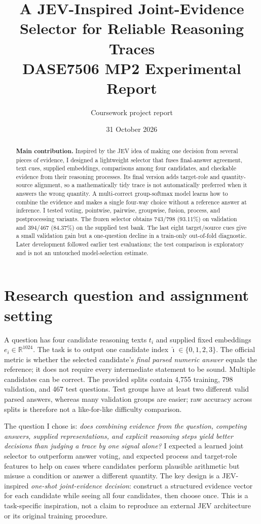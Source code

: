 \documentclass[10pt,a4paper]{article}
\title{A JEV-Inspired Joint-Evidence Selector for Reliable Reasoning Traces\\\large DASE7506 MP2 Experimental Report}
\author{Coursework project report}
\date{31 October 2026}
\newcommand{\pct}{\%}
\begin{document}
\maketitle
\vspace{-1.2em}
\begin{abstract}
\textbf{Main contribution.} Inspired by the JEV idea of making one decision from several pieces of evidence, I designed a lightweight selector that fuses final-answer agreement, text cues, supplied embeddings, comparisons among four candidates, and checkable evidence from their reasoning processes. Its final version adds target-role and quantity-source alignment, so a mathematically tidy trace is not automatically preferred when it answers the wrong quantity. A multi-correct group-softmax model learns how to combine the evidence and makes a single four-way choice without a reference answer at inference. I tested voting, pointwise, pairwise, groupwise, fusion, process, and postprocessing variants. The frozen selector obtains 743/798 (93.11\pct) on validation and 394/467 (84.37\pct) on the supplied test bank. The last eight target/source cues give a small validation gain but a one-question decline in a train-only out-of-fold diagnostic. Later development followed earlier test evaluations; the test comparison is exploratory and is not an untouched model-selection estimate.
\end{abstract}

\section{Research question and assignment setting}
A question has four candidate reasoning texts $t_i$ and supplied fixed embeddings $e_i\in\mathbb R^{1024}$. The task is to output one candidate index $\hat\imath\in\{0,1,2,3\}$. The official metric is whether the selected candidate's \emph{final parsed numeric answer} equals the reference; it does not require every intermediate statement to be sound. Multiple candidates can be correct. The provided splits contain 4,755 training, 798 validation, and 467 test questions. Test groups have at least two different valid parsed answers, whereas many validation groups are easier; raw accuracy across splits is therefore not a like-for-like difficulty comparison.

The question I chose is: \emph{does combining evidence from the question, competing answers, supplied representations, and explicit reasoning steps yield better decisions than judging a trace by one signal alone?} I expected a learned joint selector to outperform answer voting, and expected process and target-role features to help on cases where candidates perform plausible arithmetic but misuse a condition or answer a different quantity. The key design is a JEV-inspired \emph{one-shot joint-evidence decision}: construct a structured evidence vector for each candidate while seeing all four candidates, then choose once. This is a task-specific inspiration, not a claim to reproduce an external JEV architecture or its original training procedure.
\end{document}
